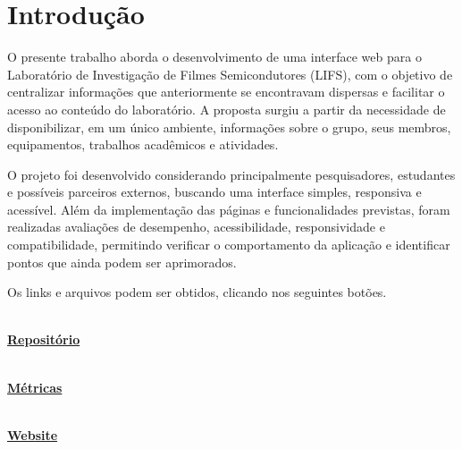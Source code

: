 
\section{Introdução}
O presente trabalho aborda o desenvolvimento de uma interface web para o Laboratório de Investigação de Filmes Semicondutores (LIFS), com o objetivo de centralizar informações que anteriormente se encontravam dispersas e facilitar o acesso ao conteúdo do laboratório. A proposta surgiu a partir da necessidade de disponibilizar, em um único ambiente, informações sobre o grupo, seus membros, equipamentos, trabalhos acadêmicos e atividades.

O projeto foi desenvolvido considerando principalmente pesquisadores, estudantes e possíveis parceiros externos, buscando uma interface simples, responsiva e acessível. Além da implementação das páginas e funcionalidades previstas, foram realizadas avaliações de desempenho, acessibilidade, responsividade e compatibilidade, permitindo verificar o comportamento da aplicação e identificar pontos que ainda podem ser aprimorados.

Os links e arquivos podem ser obtidos, clicando nos seguintes botões. 

\begin{center}
	
	\noindent
	\begin{minipage}[c]{0.30\textwidth}
		\centering
		\href{https://github.com/rick-12q/SCOM_1_LIFS_SITE}{
			\textcolor{githubcolor}{
				\Large\faGithub
			}
			\\[5pt]
			\textbf{\textcolor{githubcolor}{Repositório}}
		}
	\end{minipage}
	\hfill
	\begin{minipage}[c]{0.30\textwidth}
		\centering
		\href{https://github.com/rick-12q/SCOM_1_LIFS_SITE/blob/main/metricas.zip}{
			\textcolor{metricscolor}{
				\Large\faChartLine
			}
			\\[5pt]
			\textbf{\textcolor{metricscolor}{Métricas}}
		}
	\end{minipage}
	\hfill
	\begin{minipage}[c]{0.30\textwidth}
		\centering
		\href{https://rick-12q.github.io/SCOM_1_LIFS_SITE/}{
			\textcolor{websitecolor}{
				\Large\faGlobe
			}
			\\[5pt]
			\textbf{\textcolor{websitecolor}{Website}}
		}
	\end{minipage}
	
\end{center}

\newpage